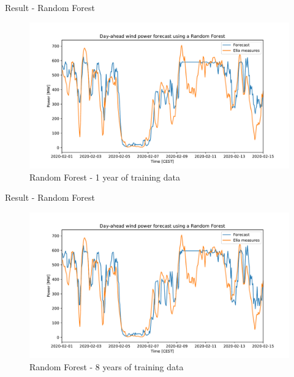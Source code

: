 \documentclass[12pt]{beamer}
\begin{document}
\begin{frame}{Result - Random Forest}
    \begin{figure}
        \centering
        \includegraphics[width=\textwidth]{resources/pdf/rf_one_year.pdf}
        \caption{Random Forest - 1 year of training data}
    \end{figure}
\end{frame}

\begin{frame}{Result - Random Forest}
    \begin{figure}
        \centering
        \includegraphics[width=\textwidth]{resources/pdf/rf_8years.pdf}
        \caption{Random Forest - 8 years of training data}
    \end{figure}
\end{frame}
\end{document}
